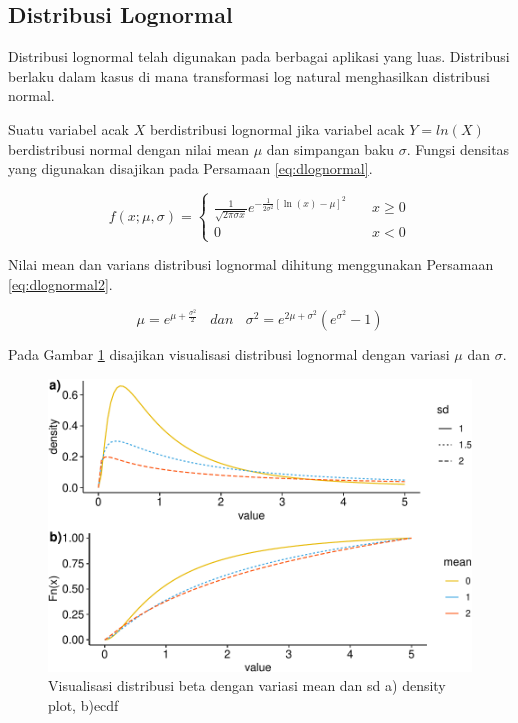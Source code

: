 \documentclass[]{book}
\begin{document}
\subsection{Distribusi Lognormal}\label{distribusi-lognormal}

Distribusi lognormal telah digunakan pada berbagai aplikasi yang luas.
Distribusi berlaku dalam kasus di mana transformasi log natural
menghasilkan distribusi normal.

Suatu variabel acak \(X\) berdistribusi lognormal jika variabel acak
\(Y=ln\left(X\right)\) berdistribusi normal dengan nilai mean \(\mu\)
dan simpangan baku \(\sigma\). Fungsi densitas yang digunakan disajikan
pada Persamaan \eqref{eq:dlognormal}.

\begin{equation}
f\left(x;\mu,\sigma \right) =
  \begin{cases}
    \frac{1}{\sqrt{2\pi\sigma x}}e^{-\frac{1}{2\sigma^2}\left[\ln\left(x\right)-\mu\right]^2}       & \quad x\ge 0\\
    0                   & \quad x<0
    \end{cases}
 \label{eq:dlognormal}
\end{equation}

Nilai mean dan varians distribusi lognormal dihitung menggunakan
Persamaan \eqref{eq:dlognormal2}.

\begin{equation}
   \mu=e^{\mu+\frac{\sigma^2}{2}}\ \ \ \ dan\ \ \ \ \sigma^2=e^{2\mu+\sigma^2}\left(e^{\sigma^2}-1\right)
  \label{eq:dlognormal2}
\end{equation}

Pada Gambar \ref{fig:dlognnormalvis} disajikan visualisasi distribusi
lognormal dengan variasi \(\mu\) dan \(\sigma\).

\begin{figure}

{\centering \includegraphics[width=0.9\linewidth]{EnvStat_files/figure-latex/dlognnormalvis-1} 

}

\caption{Visualisasi distribusi beta dengan variasi mean dan sd a) density plot, b)ecdf}\label{fig:dlognnormalvis}
\end{figure}
\end{document}

